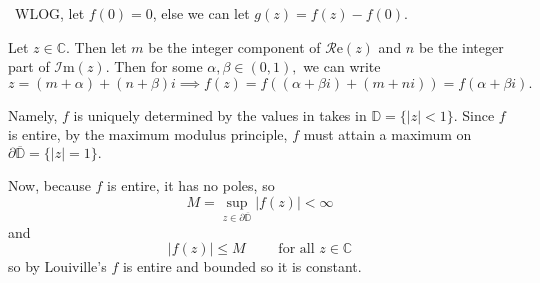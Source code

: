 \documentclass[12pt]{Homework}
\newcommand{\im}{\mathscr{I}\text{m}}
\newcommand{\re}{\mathscr{R}\text{e}}
\begin{document}
\begin{solution}$\,$
WLOG, let $f(0)=0$, else we can let $g(z)=f(z)-f(0)$. 

Let $z\in\mathbb{C}$. Then let $m$ be the integer component of $\re(z)$ and $n$ be the integer part of $\im(z).$ Then for some $\alpha,\beta\in(0,1),$ we can write $$z=(m+\alpha)+(n+\beta)i\implies f(z)=f((\alpha+\beta i)+(m+ni))=f(\alpha+\beta i).$$

Namely, $f$ is uniquely determined by the values in takes in $\mathbb{D}=\{|z|<1\}$. Since $f$ is entire, by the maximum modulus principle, $f$ must attain a maximum on $\partial\overline{\mathbb{D}}=\{|z|=1\}.$

Now, because $f$ is entire, it has no poles, so $$M=\sup_{z\in\partial\overline{\mathbb{D}}}|f(z)|<\infty$$ and $$|f(z)|\le M\qquad\text{ for all }z\in\mathbb{C}$$ so by Louiville's $f$ is entire and bounded so it is constant.
\end{solution}
\end{document}
